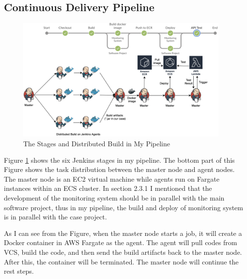 \subsection{Continuous Delivery Pipeline}
\label{my-ci}
\begin{figure}[h]
 \centering
 \includegraphics[width=0.95\textwidth]{pics/overview.png}
 \caption{The Stages and Distributed Build in My Pipeline}
 \label{fig:overview}
\end{figure}
Figure \ref{fig:overview} shows the six Jenkins stages in my pipeline. The bottom part of this Figure shows the task distribution between the master node and agent nodes. The master node is an EC2 virtual machine while agents run on Fargate instances within an ECS cluster. In section 2.3.1 I mentioned that the development of the monitoring system should be in parallel with the main software project, thus in my pipeline, the build and deploy of monitoring system is in parallel with the case project.
\par
As I can see from the Figure, when the master node starts a job, it will create a Docker container in AWS Fargate as the agent. The agent will pull codes from VCS, build the code, and then send the build artifacts back to the master node. After this, the container will be terminated. The master node will continue the rest steps.
